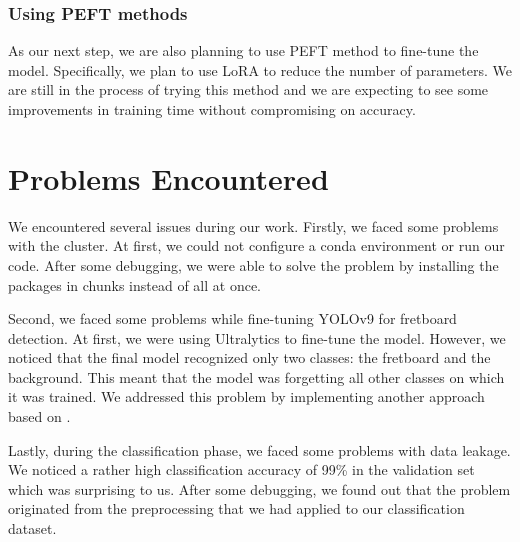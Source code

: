 \documentclass[10pt,twocolumn,letterpaper]{article}
\begin{document}
\subsubsection{Using PEFT methods}
As our next step, we are also planning to use PEFT method to fine-tune the model. Specifically, we plan to use LoRA to reduce the number of parameters. We are still in the process of trying this method and we are expecting to see some improvements in training time without compromising on accuracy.

\section{Problems Encountered}
We encountered several issues during our work. Firstly, we faced some problems with the cluster. At first, we could not configure a conda environment or run our code. After some debugging, we were able to solve the problem by installing the packages in chunks instead of all at once.

Second, we faced some problems while fine-tuning YOLOv9 for fretboard detection. At first, we were using Ultralytics to fine-tune the model. However, we noticed that the final model recognized only two classes: the fretboard and the background. This meant that the model was forgetting all other classes on which it was trained. We addressed this problem by implementing another approach based on \cite{}.

Lastly, during the classification phase, we faced some problems with data leakage. We noticed a rather high classification accuracy of 99\% in the validation set which was surprising to us. After some debugging, we found out that the problem originated from the preprocessing that we had applied to our classification dataset.


    {\small
        
        
    }
\end{document}
